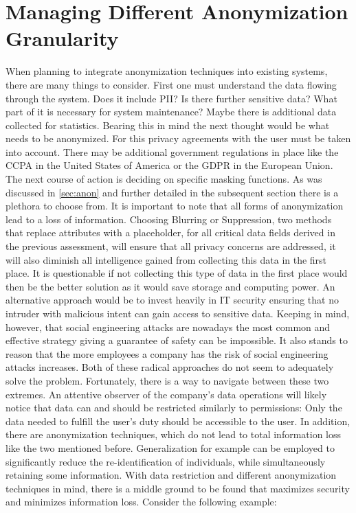 \section{Managing Different Anonymization Granularity\label{sec:anon_granularity}}
When planning to integrate anonymization techniques into existing systems, there are many things to consider. First one must understand the data flowing through the system.
Does it include \ac{PII}? Is there further sensitive data? What part of it is necessary for system maintenance? Maybe there is additional data collected for statistics.
Bearing this in mind the next thought would be what needs to be anonymized. For this privacy agreements with the user must be taken into account. There may be additional government regulations in place like the \ac{CCPA} in the United States of America or the \ac{GDPR} in the European Union. 
The next course of action is deciding on specific masking functions. As was discussed in \ref{sec:anon} and further detailed in the subsequent section there is a plethora to choose from. It is important to note that all forms of anonymization lead to a loss of information. 
Choosing Blurring or Suppression, two methods that replace attributes with a placeholder, for all critical data fields derived in the previous assessment, will ensure that all privacy concerns are addressed, it will also diminish all intelligence gained from collecting this data in the first place. It is questionable if not collecting this type of data in the first place would then be the better solution as it would save storage and computing power. 
An alternative approach would be to invest heavily in IT security ensuring that no intruder with malicious intent can gain access to sensitive data. Keeping in mind, however, that social engineering attacks are nowadays the most common and effective strategy giving a guarantee of safety can be impossible. It also stands to reason that the more employees a company has the risk of social engineering attacks increases. Both of these radical approaches do not seem to adequately solve the problem. Fortunately, there is a way to navigate between these two extremes. An attentive observer of the company's data operations will likely notice that data can and should be restricted similarly to permissions: Only the data needed to fulfill the user's duty should be accessible to the user. 
In addition, there are anonymization techniques, which do not lead to total information loss like the two mentioned before. Generalization for example can be employed to significantly reduce the re-identification of individuals, while simultaneously retaining some information.
With data restriction and different anonymization techniques in mind, there is a middle ground to be found that maximizes security and minimizes information loss. Consider the following example:

